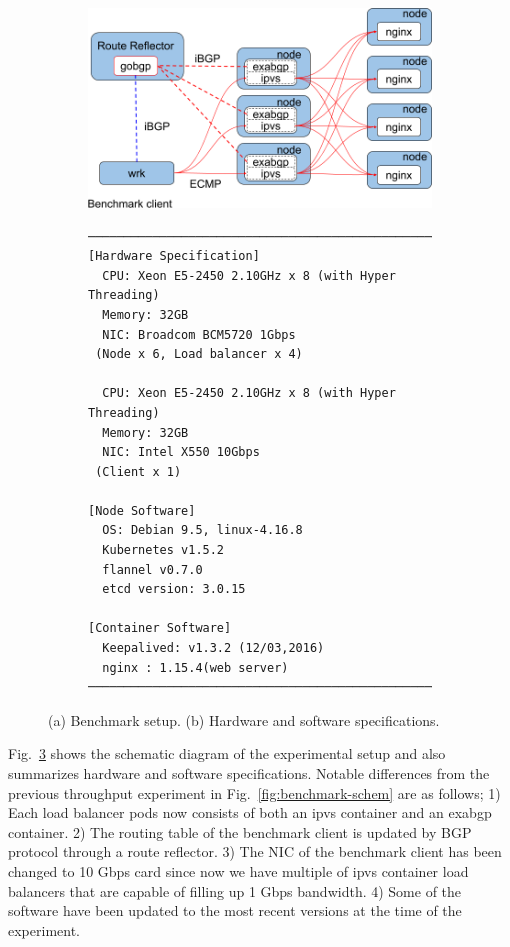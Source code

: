 \begin{figure}[h]

\begin{subfigure}[b]{\columnwidth}
    \includegraphics[width=0.9\columnwidth]{Figs/lb_ecmp_schem}
    \caption{}
    \label{fig:lb_ecmp_schem}
\end{subfigure}

  \begin{subfigure}[t]{\columnwidth}
\begin{Verbatim}[commandchars=\\\{\}]
───────────────────────────────────────────────────────
[Hardware Specification]
  CPU: Xeon E5-2450 2.10GHz x 8 (with Hyper Threading) 
  Memory: 32GB
  NIC: Broadcom BCM5720 1Gbps
 (Node x 6, Load balancer x 4)

  CPU: Xeon E5-2450 2.10GHz x 8 (with Hyper Threading) 
  Memory: 32GB
  NIC: Intel X550 10Gbps
 (Client x 1)
  
[Node Software]
  OS: Debian 9.5, linux-4.16.8
  Kubernetes v1.5.2
  flannel v0.7.0
  etcd version: 3.0.15

[Container Software]
  Keepalived: v1.3.2 (12/03,2016)
  nginx : 1.15.4(web server) 
───────────────────────────────────────────────────────
\end{Verbatim}
    \caption{}
    \label{fig:ecmp-hw_sw_spec}
  \end{subfigure}

  \caption{
    (a) Benchmark setup. (b) Hardware and software specifications.
  }
  \label{fig:ecmp-benchmark-schem}
\end{figure}

Fig.~\ref{fig:ecmp-benchmark-schem} shows the schematic diagram of the experimental setup and also summarizes hardware and software specifications.
Notable differences from the previous throughput experiment in Fig.~\ref{fig:benchmark-schem} are as follows;
1) Each load balancer pods now consists of both an ipvs container and an exabgp container.
2) The routing table of the benchmark client is updated by BGP protocol through a route reflector.
3) The NIC of the benchmark client has been changed to 10 Gbps card since now we have multiple of ipvs container load balancers that are capable of filling up 1 Gbps bandwidth.
4) Some of the software have been updated to the most recent versions at the time of the experiment.

